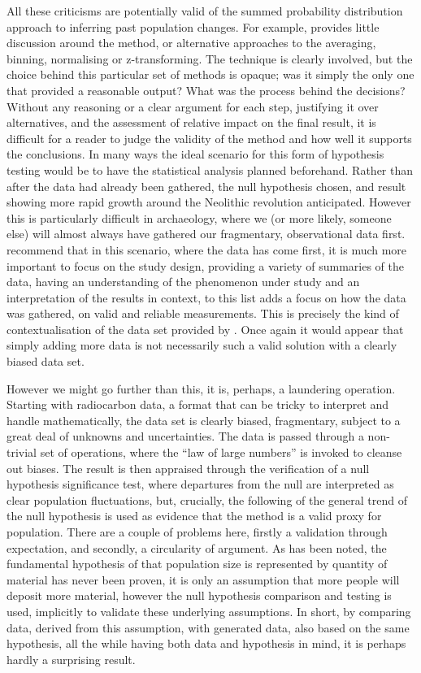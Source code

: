 All these criticisms are potentially valid of the summed probability distribution approach to inferring past population changes. For example, \citet{TIMPSON2014549} provides little discussion around the method, or alternative approaches to the averaging, binning, normalising or z-transforming. The technique is clearly involved, but the choice behind this particular set of methods is opaque; was it simply the only one that provided a reasonable output? What was the process behind the decisions? Without any reasoning or a clear argument for each step, justifying it over alternatives, and the assessment of relative impact on the final result, it is difficult for a reader to judge the validity of the method and how well it supports the conclusions. In many ways the ideal scenario for this form of hypothesis testing would be to have the statistical analysis planned beforehand. Rather than after the data had already been gathered, the null hypothesis chosen, and result showing more rapid growth around the Neolithic revolution anticipated. However this is particularly difficult in archaeology, where we (or more likely, someone else) will almost always have gathered our fragmentary, observational data first. \citet{doi:10.1080/00031305.2016.1154108} recommend that in this scenario, where the data has come first, it is much more important to focus on the study design, providing a variety of summaries of the data, having an understanding of the phenomenon under study and an interpretation of the results in context, to this list \citet{Gelman:2016fk} adds a focus on how the data was gathered, on valid and reliable measurements. This is precisely the kind of contextualisation of the data set provided by \citet{Torfing2015193}. Once again it would appear that simply adding more data is not necessarily such a valid solution with a clearly biased data set.

However we might go further than this, it is, perhaps, a laundering operation. Starting with radiocarbon data, a format that can be tricky to interpret and handle mathematically, the data set is clearly biased, fragmentary, subject to a great deal of unknowns and uncertainties. The data is passed through a non-trivial set of operations, where the ``law of large numbers'' is invoked to cleanse out biases. The result is then appraised through the verification of a null hypothesis significance test, where departures from the null are interpreted as clear population fluctuations, but, crucially, the following of the general trend of the null hypothesis is used as evidence that the method is a valid proxy for population. There are a couple of problems here, firstly a validation through expectation, and secondly, a circularity of argument. As has been noted, the fundamental hypothesis of \citet{10.2307/281060} that population size is represented by quantity of material has never been proven, it is only an assumption that more people will deposit more material, however the null hypothesis comparison and testing is used, implicitly to validate these underlying assumptions. In short, by comparing data, derived from this assumption, with generated data, also based on the same hypothesis, all the while having both data and hypothesis in mind, it is perhaps hardly a surprising result. 

